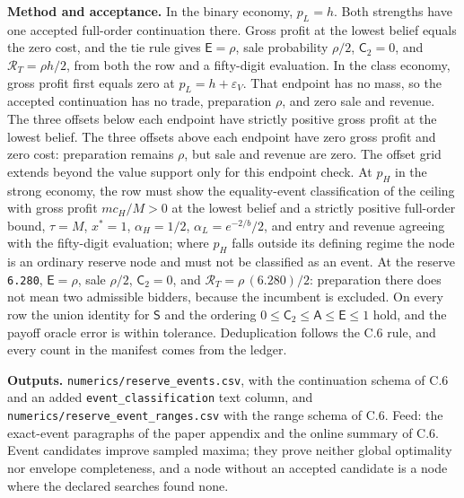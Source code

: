 \textbf{Method and acceptance.} In the binary economy, \(p_L=h\). Both
strengths have one accepted full-order continuation there. Gross profit
at the lowest belief equals the zero cost, and the tie rule gives
\(\mathsf E=\rho\), sale probability \(\rho/2\), \(\mathsf C_2=0\), and
\(\mathcal R_T=\rho h/2\), from both the row and a fifty-digit
evaluation. In the class economy, gross profit first equals zero at
\(p_L=h+\varepsilon_V\). That endpoint has no mass, so the accepted
continuation has no trade, preparation \(\rho\), and zero sale and
revenue. The three offsets below each endpoint have strictly positive
gross profit at the lowest belief. The three offsets above each endpoint
have zero gross profit and zero cost: preparation remains \(\rho\), but
sale and revenue are zero. The offset grid extends beyond the value
support only for this endpoint check. At \(p_H\) in the strong economy,
the row must show the equality-event classification of the ceiling with
gross profit \(mc_H/M>0\) at the lowest belief and a strictly positive
full-order bound, \(\tau=M\), \(x^*=1\), \(\alpha_H=1/2\),
\(\alpha_L=e^{-2/b}/2\), and entry and revenue agreeing with the
fifty-digit evaluation; where \(p_H\) falls outside its defining regime
the node is an ordinary reserve node and must not be classified as an
event. At the reserve \texttt{6.280}, \(\mathsf E=\rho\), sale
\(\rho/2\), \(\mathsf C_2=0\), and \(\mathcal R_T=\rho\,(6.280)/2\):
preparation there does not mean two admissible bidders, because the
incumbent is excluded. On every row the union identity for \(\mathsf S\)
and the ordering \(0\le\mathsf C_2\le\mathsf A\le\mathsf E\le1\) hold,
and the payoff oracle error is within tolerance. Deduplication follows
the C.6 rule, and every count in the manifest comes from the ledger.

\textbf{Outputs.} \texttt{numerics/reserve\_events.csv}, with the
continuation schema of C.6 and an added \texttt{event\_classification}
text column, and \texttt{numerics/reserve\_event\_ranges.csv} with the
range schema of C.6. Feed: the exact-event paragraphs of the paper
appendix and the online summary of C.6. Event candidates improve sampled
maxima; they prove neither global optimality nor envelope completeness,
and a node without an accepted candidate is a node where the declared
searches found none.
